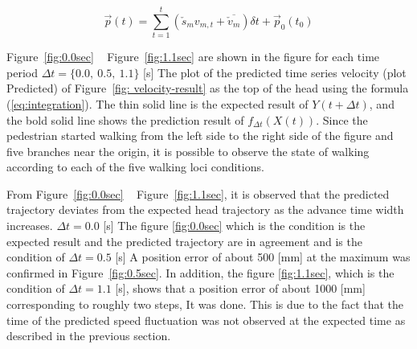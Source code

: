 \documentclass{sigchi}
\begin{document}
\begin{equation}
\vec{p}(t) = \sum^{t}_{t=1}(\check{s}_m  v_{m,t} +  \overline{\check{v}_{m}})  \delta t+ \vec{p}_0(t_0)
\label{eq:integration}
\end{equation}


Figure~\ref{fig:0.0sec} ~ Figure~\ref{fig:1.1sec} are shown in the figure for each time period $ \Delta t = \{0.0, \ 0.5, \ 1.1 \} $ [s] The plot of the predicted time series velocity (plot Predicted) of Figure~\ref{fig: velocity-result} as the top of the head using the formula (\ref {eq:integration}). The thin solid line is the expected result of $ Y (t + \Delta t) $, and the bold solid line shows the prediction result of $ f_ {\Delta t} (X (t)) $. Since the pedestrian started walking from the left side to the right side of the figure and five branches near the origin, it is possible to observe the state of walking according to each of the five walking loci conditions.


From Figure~\ref{fig:0.0sec} ~ Figure~\ref{fig:1.1sec}, it is observed that the predicted trajectory deviates from the expected head trajectory as the advance time width increases. $ \Delta t = 0.0 $ [s] The figure \ref{fig:0.0sec} which is the condition is the expected result and the predicted trajectory are in agreement and is the condition of $ \Delta t = 0.5 $ [s] A position error of about 500 [mm] at the maximum was confirmed in Figure~\ref{fig:0.5sec}. In addition, the figure \ref{fig:1.1sec}, which is the condition of $ \Delta t = 1.1 $ [s], shows that a position error of about 1000 [mm] corresponding to roughly two steps, It was done. This is due to the fact that the time of the predicted speed fluctuation was not observed at the expected time as described in the previous section.
\end{document}
